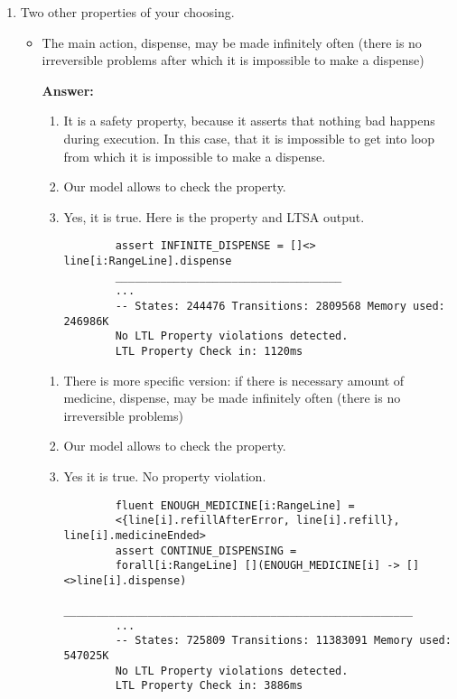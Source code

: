\documentclass{article}
\begin{document}
\begin{enumerate}
    \item Two other properties of your choosing.
    
    \begin{itemize}
    \item The main action, dispense, may be made infinitely often (there is no irreversible problems after which it is
    impossible to make a dispense)
    
    \textbf{Answer:}
    \begin{enumerate}
    	\item It is a safety property, because it asserts that nothing bad happens during execution. In this case, that it is
    	impossible to get into loop from which it is impossible to make a dispense.
    	\item Our model allows to check the property. 
    	\item Yes, it is true. Here is the property and LTSA output.
    	\begin{verbatim}    	
    	assert INFINITE_DISPENSE = []<> line[i:RangeLine].dispense
    	___________________________________
    	...
    	-- States: 244476 Transitions: 2809568 Memory used: 246986K
    	No LTL Property violations detected.
    	LTL Property Check in: 1120ms
    	 \end{verbatim}
    	 \end{enumerate}
    	 \begin{enumerate}
    	 \item There is more specific version: if there is necessary amount of medicine, dispense, may be made infinitely
    	 often (there is no irreversible problems)
    	 \item Our model allows to check the property.
    	 \item Yes it is true. No property violation.
    	 \begin{verbatim}
    	fluent ENOUGH_MEDICINE[i:RangeLine] =
    	<{line[i].refillAfterError, line[i].refill}, line[i].medicineEnded>
    	assert CONTINUE_DISPENSING =
    	forall[i:RangeLine] [](ENOUGH_MEDICINE[i] -> [] <>line[i].dispense)
    	______________________________________________________
    	...
    	-- States: 725809 Transitions: 11383091 Memory used: 547025K
    	No LTL Property violations detected.
    	LTL Property Check in: 3886ms
    	

\end{verbatim}
\end{enumerate}
\end{itemize}
\end{enumerate}
\end{document}
